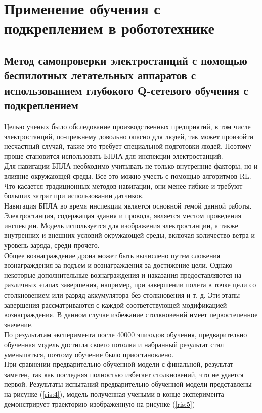 \documentclass[12 pt, a4paper]{article}
\theoremstyle{definition}
\theoremstyle{plain}
\theoremstyle{remark}
\begin{document}
\section{Применение обучения с подкреплением в робототехнике}
\subsection{Метод самопроверки электростанций с помощью беспилотных летательных аппаратов с использованием глубокого Q-сетевого обучения с подкреплением \cite{litlink2}}

Целью ученых было обследование производственных предприятий, в том числе электростанций, по-прежнему довольно опасно для людей, так может произойти несчастный случай, также это требует специальной подготовки людей. Поэтому проще становится использовать БПЛА для инспекции электростанций.\\
Для навигации БПЛА необходимо учитывать не только внутренние факторы, но и влияние окружающей среды. Все это можно учесть с помощью алгоритмов RL. Что касается традиционных методов навигации, они менее гибкие и требуют больших затрат при использовании датчиков.\\

Навигация БПЛА во время инспекции является основной темой данной работы. Электростанция, содержащая здания и провода, является местом проведения инспекции. Модель используется для изображения электростанции, а также внутренних и внешних условий окружающей среды, включая количество ветра и уровень заряда, среди прочего.\\

Общее вознаграждение дрона может быть вычислено путем сложения вознаграждения  за подъем и вознаграждения за достижение цели. Однако некоторые дополнительные вознаграждения и наказания предоставляются на различных этапах завершения, например, при завершении полета в точке цели со столкновением или разряд аккумулятора без столкновения и т. д. Эти этапы завершения рассматриваются с каждой соответствующей модификацией вознаграждения. В данном случае избежание столкновений имеет первостепенное значение.\\

По результатам эксперимента после 40000 эпизодов обучения, предварительно обученная модель достигла своего потолка и набранный результат стал уменьшаться, поэтому обучение было приостановлено. \\
При сравнении предварительно обученной модели с финальной, результат заметен, так как последняя полностью избегает столкновений, что не удается первой. Результаты испытаний предварительно обученной модели представлены на рисунке (\ref{ris:4}), модель полученная учеными в конце эксперимента демонстрирует траекторию изображенную на рисунке (\ref{ris:5})\\
\end{document}
